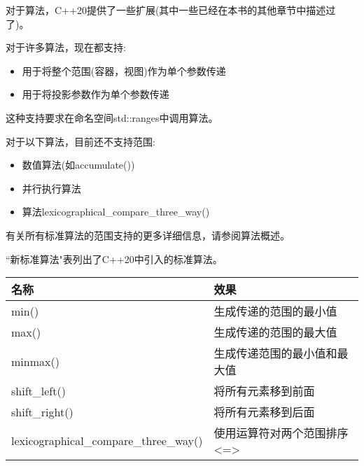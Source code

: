 

对于算法，C++20提供了一些扩展(其中一些已经在本书的其他章节中描述过了)。


对于许多算法，现在都支持:

\begin{itemize}
\item
用于将整个范围(容器，视图)作为单个参数传递

\item
用于将投影参数作为单个参数传递
\end{itemize}

这种支持要求在命名空间std::ranges中调用算法。

对于以下算法，目前还不支持范围:

\begin{itemize}
\item
数值算法(如accumulate())

\item
并行执行算法

\item
算法lexicographical\_compare\_three\_way()
\end{itemize}

有关所有标准算法的范围支持的更多详细信息，请参阅算法概述。


“新标准算法"表列出了C++20中引入的标准算法。

\begin{longtable}[c]{|l|l|}
\hline
\textbf{名称}  & \textbf{效果}                            \\ \hline
\endfirsthead
%
\endhead
%
min()          & 生成传递的范围的最小值 \\ \hline
max()          & 生成传递的范围的最大值 \\ \hline
minmax()       & 生成传递范围的最小值和最大值       \\ \hline
shift\_left()  & 将所有元素移到前面            \\ \hline
shift\_right() & 将所有元素移到后面             \\ \hline
lexicographical\_compare\_three\_way() & 使用运算符对两个范围排序 \textless{}=\textgreater{} \\ \hline
\end{longtable}


